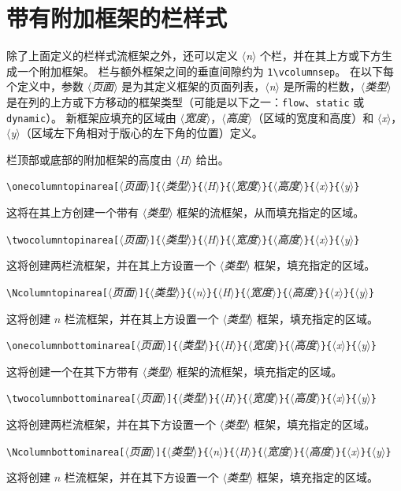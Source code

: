 \documentclass[a4paper]{book}%
\newcommand{\meta}[1]{\textnormal{\ensuremath{\langle}\makebox[0pt][l]{}\emph{#1}\makebox[0pt][l]{}\ensuremath{\rangle}}}
\newcommand{\cmd}[1]{\texttt{#1}}
\begin{document}
\section{带有附加框架的栏样式}%
除了上面定义的栏样式流框架之外，还可以定义 \meta{n} 个栏，并在其上方或下方生成一个附加框架。 栏与额外框架之间的垂直间隙约为 \verb|1\vcolumnsep|。 在以下每个定义中，参数 \meta{页面} 是为其定义框架的页面列表，\meta{n} 是所需的栏数，\meta{类型} 是在列的上方或下方移动的框架类型（可能是以下之一：\cmd{flow}、\cmd{static} 或 \cmd{dynamic}）。 新框架应填充的区域由 \meta{宽度}，\meta{高度}（区域的宽度和高度）和 \meta{x}，\meta{y}（区域左下角相对于版心的左下角的位置）定义。

栏顶部或底部的附加框架的高度由 \meta{H} 给出。
\begin{mdframed}
    \verb|\onecolumntopinarea[|\meta{页面}\verb|]{|\meta{类型}\verb|}{|\meta{H}\verb|}{|\meta{宽度}\verb|}{|\meta{高度}\verb|}{|\meta{x}\verb|}{|\meta{y}\verb|}|
\end{mdframed}
这将在其上方创建一个带有 \meta{类型} 框架的流框架，从而填充指定的区域。
\begin{mdframed}
    \verb|\twocolumntopinarea[|\meta{页面}\verb|]{|\meta{类型}\verb|}{|\meta{H}\verb|}{|\meta{宽度}\verb|}{|\meta{高度}\verb|}{|\meta{x}\verb|}{|\meta{y}\verb|}|
\end{mdframed}
这将创建两栏流框架，并在其上方设置一个 \meta{类型} 框架，填充指定的区域。
\begin{mdframed}
    \verb|\Ncolumntopinarea[|\meta{页面}\verb|]{|\meta{类型}\verb|}{|\meta{n}\verb|}{|\meta{H}\verb|}{|\meta{宽度}\verb|}{|\meta{高度}\verb|}{|\meta{x}\verb|}{|\meta{y}\verb|}|
\end{mdframed}
这将创建 $n$ 栏流框架，并在其上方设置一个 \meta{类型} 框架，填充指定的区域。 
\begin{mdframed}
    \verb|\onecolumnbottominarea[|\meta{页面}\verb|]{|\meta{类型}\verb|}{|\meta{H}\verb|}{|\meta{宽度}\verb|}{|\meta{高度}\verb|}{|\meta{x}\verb|}{|\meta{y}\verb|}|
\end{mdframed}
这将创建一个在其下方带有 \meta{类型} 框架的流框架，填充指定的区域。
\begin{mdframed}
    \verb|\twocolumnbottominarea[|\meta{页面}\verb|]{|\meta{类型}\verb|}{|\meta{H}\verb|}{|\meta{宽度}\verb|}{|\meta{高度}\verb|}{|\meta{x}\verb|}{|\meta{y}\verb|}|
\end{mdframed}
这将创建两栏流框架，并在其下方设置一个 \meta{类型} 框架，填充指定的区域。
\begin{mdframed}
    \verb|\Ncolumnbottominarea[|\meta{页面}\verb|]{|\meta{类型}\verb|}{|\meta{n}\verb|}{|\meta{H}\verb|}{|\meta{宽度}\verb|}{|\meta{高度}\verb|}{|\meta{x}\verb|}{|\meta{y}\verb|}|
\end{mdframed}
这将创建 $n$ 栏流框架，并在其下方设置一个 \meta{类型} 框架，填充指定的区域。 
\end{document}

